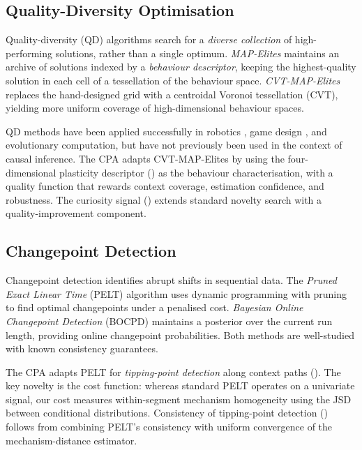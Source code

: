 \documentclass[11pt,a4paper]{article}
\theoremstyle{definition}
\begin{document}
\subsection{Quality-Diversity Optimisation}

Quality-diversity (QD) algorithms search for a \emph{diverse collection}
of high-performing solutions, rather than a single optimum.  \emph{MAP-Elites}
\citep{mouret2015illuminating} maintains an archive of solutions indexed
by a \emph{behaviour descriptor}, keeping the highest-quality solution in
each cell of a tessellation of the behaviour space.
\emph{CVT-MAP-Elites} \citep{vassiliades2018using} replaces the
hand-designed grid with a centroidal Voronoi tessellation (CVT), yielding
more uniform coverage of high-dimensional behaviour spaces.

QD methods have been applied successfully in robotics
\citep{cully2015robots}, game design \citep{gravina2019procedural}, and
evolutionary computation, but have not previously been used in the context
of causal inference.  The CPA adapts CVT-MAP-Elites by using the
four-dimensional plasticity descriptor ()
as the behaviour characterisation, with a quality function that rewards
context coverage, estimation confidence, and robustness.  The curiosity
signal () extends standard novelty search
\citep{lehman2011abandoning} with a quality-improvement component.

\subsection{Changepoint Detection}

Changepoint detection identifies abrupt shifts in sequential data.  The
\emph{Pruned Exact Linear Time} (PELT) algorithm \citep{killick2012optimal}
uses dynamic programming with pruning to find optimal changepoints under a
penalised cost.  \emph{Bayesian Online Changepoint Detection} (BOCPD)
\citep{adams2007bayesian} maintains a posterior over the current run
length, providing online changepoint probabilities.  Both methods are
well-studied with known consistency guarantees.

The CPA adapts PELT for \emph{tipping-point detection} along context
paths ().  The key novelty is the cost function:
whereas standard PELT operates on a univariate signal, our cost measures
within-segment mechanism homogeneity using the JSD between conditional
distributions.  Consistency of tipping-point detection
() follows from combining PELT's consistency with
uniform convergence of the mechanism-distance estimator.
\end{document}
